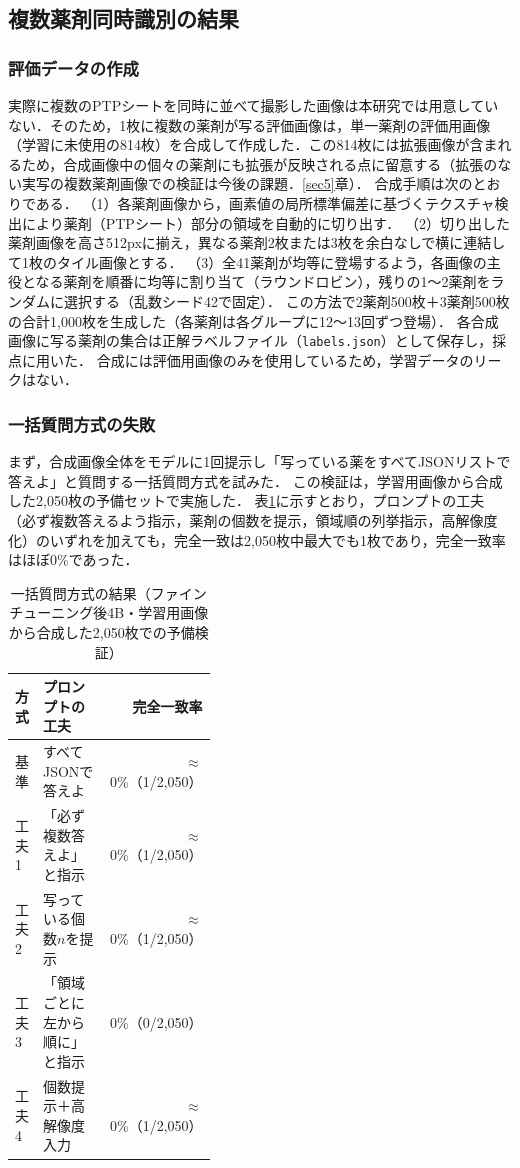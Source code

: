 \documentclass[dvipdfmx]{jsarticle}
\begin{document}
\subsection{複数薬剤同時識別の結果}\label{sec:multi_result}

\subsubsection{評価データの作成}

実際に複数のPTPシートを同時に並べて撮影した画像は本研究では用意していない．そのため，1枚に複数の薬剤が写る評価画像は，単一薬剤の評価用画像（学習に未使用の814枚）を合成して作成した．この814枚には拡張画像が含まれるため，合成画像中の個々の薬剤にも拡張が反映される点に留意する（拡張のない実写の複数薬剤画像での検証は今後の課題．\ref{sec5}章）．
合成手順は次のとおりである．
（1）各薬剤画像から，画素値の局所標準偏差に基づくテクスチャ検出により薬剤（PTPシート）部分の領域を自動的に切り出す．
（2）切り出した薬剤画像を高さ512pxに揃え，異なる薬剤2枚または3枚を余白なしで横に連結して1枚のタイル画像とする．
（3）全41薬剤が均等に登場するよう，各画像の主役となる薬剤を順番に均等に割り当て（ラウンドロビン），残りの1〜2薬剤をランダムに選択する（乱数シード42で固定）．
この方法で2薬剤500枚＋3薬剤500枚の合計1,000枚を生成した（各薬剤は各グループに12〜13回ずつ登場）．
各合成画像に写る薬剤の集合は正解ラベルファイル（\texttt{labels.json}）として保存し，採点に用いた．
合成には評価用画像のみを使用しているため，学習データのリークはない．

\subsubsection{一括質問方式の失敗}

まず，合成画像全体をモデルに1回提示し「写っている薬をすべてJSONリストで答えよ」と質問する一括質問方式を試みた．
この検証は，学習用画像から合成した2,050枚の予備セットで実施した．
表\ref{tab:multi_naive}に示すとおり，プロンプトの工夫（必ず複数答えるよう指示，薬剤の個数を提示，領域順の列挙指示，高解像度化）のいずれを加えても，完全一致は2,050枚中最大でも1枚であり，完全一致率はほぼ0\%であった．

\begin{table}[htbp]
\centering
\caption{一括質問方式の結果（ファインチューニング後4B・学習用画像から合成した2,050枚での予備検証）}
\label{tab:multi_naive}
\small
\begin{tabular}{lp{0.4\linewidth}r}
\hline
方式 & プロンプトの工夫 & 完全一致率 \\
\hline
基準 & すべてJSONで答えよ & $\approx$0\%（1/2,050） \\
工夫1 & 「必ず複数答えよ」と指示 & $\approx$0\%（1/2,050） \\
工夫2 & 写っている個数$n$を提示 & $\approx$0\%（1/2,050） \\
工夫3 & 「領域ごとに左から順に」と指示 & 0\%（0/2,050） \\
工夫4 & 個数提示＋高解像度入力 & $\approx$0\%（1/2,050） \\
\hline
\end{tabular}
\end{table}
\end{document}
